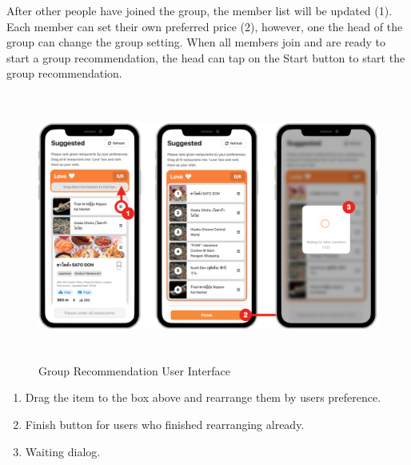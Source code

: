 \documentclass[12pt,oneside,openright,a4paper]{cpe-english-project}
\begin{document}
After other people have joined the group, the member list will be updated (1). Each member can set their own preferred price (2), however, one the head of the group can change the group setting. When all members join and  are ready to start a group recommendation, the head can tap on the Start button to start the group recommendation.
\begin{figure}[H]\centering
\includegraphics[height=250pt]{./images/4ui_GroupRecommendationUserInterface.png}
\caption{Group Recommendation User Interface}\label{fig:4ui_GroupRecommendationUserInterface}
\end{figure}\vspace{-24pt}

\begin{enumerate}
\item Drag the item to the box above and rearrange them by users preference.
\item Finish button for users who finished rearranging already.
\item Waiting dialog.
\end{enumerate}
\end{document}
